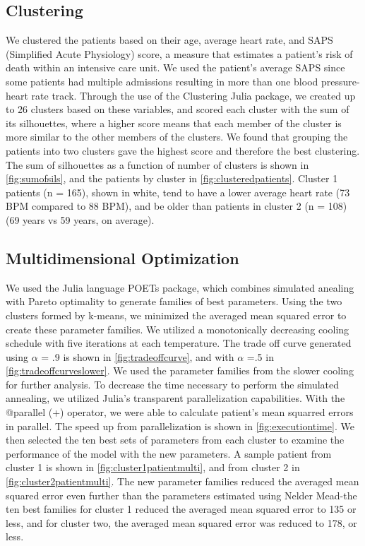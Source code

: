 \documentclass[fleqn,10pt]{wlscirep}
\begin{document}
\subsection*{Clustering}
We clustered the patients based on their age, average heart rate, and SAPS (Simplified Acute Physiology) score, a measure that estimates a patient's risk of death within an intensive care unit.\cite{le1993new} We used the patient's average SAPS since some patients had multiple admissions resulting in more than one blood pressure-heart rate track. 
Through the use of the Clustering Julia package, we created up to 26 clusters based on these variables, and scored each cluster with the sum of its silhouettes, where a higher score means that each member of the cluster is more similar to the other members of the clusters.\cite{rousseeuw1987silhouettes} We found that grouping the patients into two clusters gave the highest score and therefore the best clustering. The sum of silhouettes as a function of number of clusters is shown in \ref{fig:sumofsils}, and the patients by cluster in \ref{fig:clusteredpatients}. Cluster 1 patients (n = 165), shown in white, tend to have a lower average heart rate (73 BPM compared to 88 BPM), and be older than patients in cluster 2 (n = 108) (69 years vs 59 years, on average). 
\subsection*{Multidimensional Optimization}
We used the Julia language POETs package, which combines simulated anealing with Pareto optimality to generate families of best parameters.\cite{bassen2016jupoets} Using the two clusters formed by k-means, we minimized the averaged mean squared error to create these parameter families. We utilized a monotonically decreasing cooling schedule with five iterations at each temperature. The trade off curve generated using $\alpha$ = .9 is shown in \ref{fig:tradeoffcurve}, and with $\alpha$ =.5  in \ref{fig:tradeoffcurveslower}. We used the parameter families from the slower cooling for further analysis. 
To decrease the time necessary to perform the simulated annealing, we utilized Julia's transparent parallelization capabilities. With the @parallel (+) operator, we were able to calculate patient's mean squarred errors in parallel. The speed up from parallelization is shown in \ref{fig:executiontime}. 
We then selected the ten best sets of parameters from each cluster to examine the performance of the model with the new parameters. A sample patient from cluster 1 is shown in \ref{fig:cluster1patientmulti}, and from cluster 2 in \ref{fig:cluster2patientmulti}. The new parameter families reduced the averaged mean squared error even further than the parameters estimated using Nelder Mead-the ten best families for cluster 1 reduced the averaged mean squared error to 135 or less, and for cluster two, the averaged mean squared error was reduced to 178, or less. 
\end{document}

